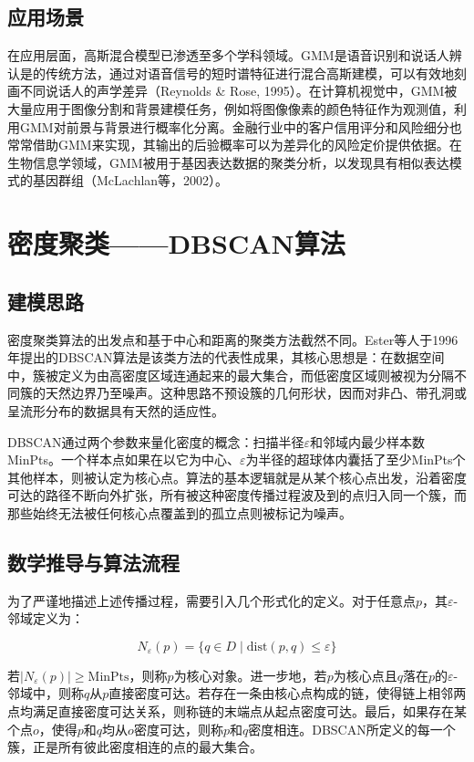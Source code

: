 \documentclass{article}
\begin{document}
\subsection{应用场景}

在应用层面，高斯混合模型已渗透至多个学科领域。GMM是语音识别和说话人辨认是的传统方法，通过对语音信号的短时谱特征进行混合高斯建模，可以有效地刻画不同说话人的声学差异（Reynolds \& Rose, 1995）。在计算机视觉中，GMM被大量应用于图像分割和背景建模任务，例如将图像像素的颜色特征作为观测值，利用GMM对前景与背景进行概率化分离。金融行业中的客户信用评分和风险细分也常常借助GMM来实现，其输出的后验概率可以为差异化的风险定价提供依据。在生物信息学领域，GMM被用于基因表达数据的聚类分析，以发现具有相似表达模式的基因群组（McLachlan等，2002）。

\section{密度聚类——DBSCAN算法}

\subsection{建模思路}

密度聚类算法的出发点和基于中心和距离的聚类方法截然不同。Ester等人于1996年提出的DBSCAN算法是该类方法的代表性成果，其核心思想是：在数据空间中，簇被定义为由高密度区域连通起来的最大集合，而低密度区域则被视为分隔不同簇的天然边界乃至噪声。这种思路不预设簇的几何形状，因而对非凸、带孔洞或呈流形分布的数据具有天然的适应性。

DBSCAN通过两个参数来量化密度的概念：扫描半径$\varepsilon$和邻域内最少样本数MinPts。一个样本点如果在以它为中心、$\varepsilon$为半径的超球体内囊括了至少MinPts个其他样本，则被认定为核心点。算法的基本逻辑就是从某个核心点出发，沿着密度可达的路径不断向外扩张，所有被这种密度传播过程波及到的点归入同一个簇，而那些始终无法被任何核心点覆盖到的孤立点则被标记为噪声。

\subsection{数学推导与算法流程}

为了严谨地描述上述传播过程，需要引入几个形式化的定义。对于任意点$p$，其$\varepsilon$-邻域定义为：

\begin{equation}
N_\varepsilon(p) = \{ q \in D \mid \text{dist}(p, q) \leq \varepsilon \}
\end{equation}

若$|N_\varepsilon(p)| \geq \text{MinPts}$，则称$p$为核心对象。进一步地，若$p$为核心点且$q$落在$p$的$\varepsilon$-邻域中，则称$q$从$p$直接密度可达。若存在一条由核心点构成的链，使得链上相邻两点均满足直接密度可达关系，则称链的末端点从起点密度可达。最后，如果存在某个点$o$，使得$p$和$q$均从$o$密度可达，则称$p$和$q$密度相连。DBSCAN所定义的每一个簇，正是所有彼此密度相连的点的最大集合。
\end{document}
